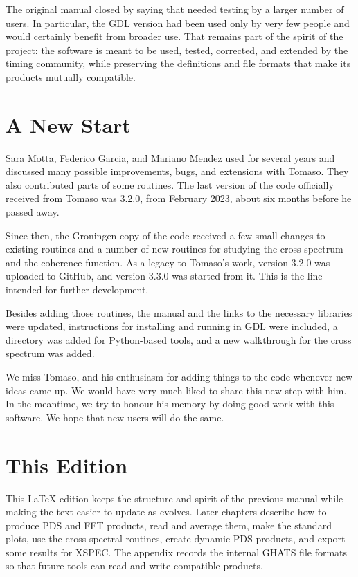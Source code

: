 The original manual closed by saying that \ghats{} needed testing by a larger
number of users.  In particular, the GDL version had been used only by very few
people and would certainly benefit from broader use.  That remains part of the
spirit of the project: the software is meant to be used, tested, corrected, and
extended by the timing community, while preserving the definitions and file
formats that make its products mutually compatible.

\section{A New Start}

Sara Motta, Federico Garcia, and Mariano Mendez used \ghats{} for several years
and discussed many possible improvements, bugs, and extensions with Tomaso.
They also contributed parts of some routines.  The last version of the code
officially received from Tomaso was 3.2.0, from February 2023, about six months
before he passed away.

Since then, the Groningen copy of the code received a few small changes to
existing routines and a number of new routines for studying the cross spectrum
and the coherence function.  As a legacy to Tomaso's work, version 3.2.0 was
uploaded to GitHub, and version 3.3.0 was started from it.  This is the line
intended for further development.

Besides adding those routines, the manual and the links to the necessary
libraries were updated, instructions for installing and running \ghats{} in GDL
were included, a  directory was added for Python-based \ghats{}
tools, and a new walkthrough for the cross spectrum was added.

We miss Tomaso, and his enthusiasm for adding things to the code whenever new
ideas came up.  We would have very much liked to share this new step with him.
In the meantime, we try to honour his memory by doing good work with this
software.  We hope that new users will do the same.

\section{This Edition}

This LaTeX edition keeps the structure and spirit of the previous manual while
making the text easier to update as \ghats{} evolves.  Later chapters describe
how to produce PDS and FFT products, read and average them, make the standard
plots, use the cross-spectral routines, create dynamic PDS products, and export
some results for XSPEC.  The appendix records the internal GHATS file formats so
that future tools can read and write compatible products.
